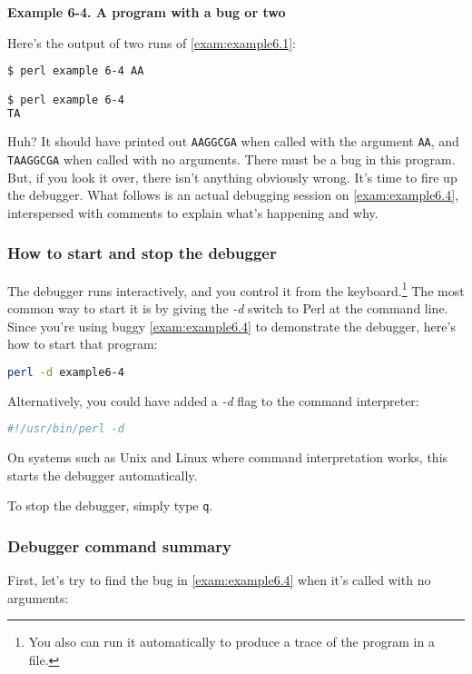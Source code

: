 \textbf{Example 6-4. A program with a bug or two}


Here's the output of two runs of \autoref{exam:example6.1}:

\begin{lstlisting}[language=bash]
$ perl example 6-4 AA

$ perl example 6-4
TA
\end{lstlisting}

Huh? It should have printed out \verb|AAGGCGA| when called with the argument \verb|AA|, and \verb|TAAGGCGA| when called with no arguments. There must be a bug in this program. But, if you look it over, there isn't anything obviously wrong. It's time to fire up the debugger. What follows is an actual debugging session on \autoref{exam:example6.4}, interspersed with comments to explain what's happening and why. 

\subsubsection{How to start and stop the debugger}
The debugger runs interactively, and you control it from the keyboard.\footnote{You also can run it automatically to produce a trace of the program in a file.} The most common way to start it is by giving the \textit{-d} switch to Perl at the command line. Since you're using buggy \autoref{exam:example6.4} to demonstrate the debugger, here's how to start that program:

\begin{lstlisting}[language=bash]
perl -d example6-4
\end{lstlisting}

Alternatively, you could have added a \textit{-d} flag to the command interpreter:

\begin{lstlisting}[language=bash]
#!/usr/bin/perl -d
\end{lstlisting}

On systems such as Unix and Linux where command interpretation works, this starts the debugger automatically.

To stop the debugger, simply type \verb|q|.

\subsubsection{Debugger command summary}
First, let's try to find the bug in \autoref{exam:example6.4} when it's called with no arguments:

